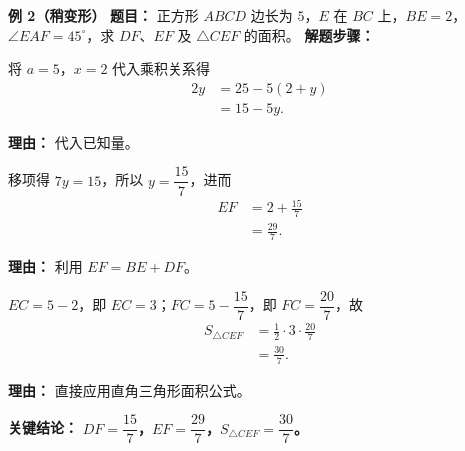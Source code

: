 \begin{examplebox}
	\medskip
	\textbf{\textcolor{CExample}{例 2（稍变形）}}
	\textbf{\textcolor{CExample}{题目：}}
	正方形 $ABCD$ 边长为 $5$，$E$ 在 $BC$ 上，$BE=2$，$\angle EAF=45^\circ$，求 $DF$、$EF$ 及 $\triangle CEF$ 的面积。
	\textbf{\textcolor{CExample}{解题步骤：}}
	\begin{description}[style=nextline, leftmargin=2.8em, labelsep=0.5em, itemsep=0.45em]
		\item[\textbf{第一步（代入求$y$）：}]
			将 $a=5$，$x=2$ 代入乘积关系得
			\[
				\begin{aligned}
					2y &= 25 - 5(2+y) \\ &= 15 - 5y.
			\end{aligned}
			\]
			\par\textbf{理由：} 代入已知量。
		\item[\textbf{第二步（解方程得$y$，再求$EF$）：}]
			移项得 $7y=15$，所以 $y=\dfrac{15}{7}$，进而
			\[
				\begin{aligned}
					EF &= 2 + \frac{15}{7} \\ &= \frac{29}{7}.
			\end{aligned}
			\]
			\par\textbf{理由：} 利用 $EF = BE + DF$。
		\item[\textbf{第三步（计算面积）：}]
			$EC = 5-2$，即 $EC=3$；$FC = 5-\dfrac{15}{7}$，即 $FC = \dfrac{20}{7}$，故
			\[
				\begin{aligned}
					S_{\triangle CEF} &= \frac12 \cdot 3 \cdot \frac{20}{7} \\ &= \frac{30}{7}.
			\end{aligned}
			\]
			\par\textbf{理由：} 直接应用直角三角形面积公式。
	\end{description}
	\textbf{\textcolor{CExample}{关键结论：}}
	\textbf{$DF = \dfrac{15}{7}$，$EF = \dfrac{29}{7}$，$S_{\triangle CEF} = \dfrac{30}{7}$。}


\end{examplebox}
